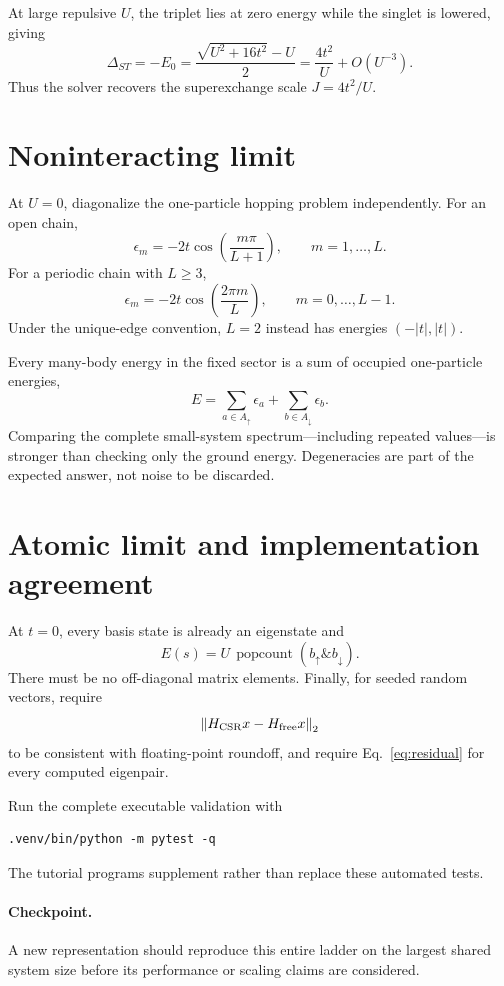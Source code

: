 At large repulsive $U$, the triplet lies at zero energy while the singlet is
lowered, giving
\begin{equation}
\Delta_{ST}=-E_0
=\frac{\sqrt{U^2+16t^2}-U}{2}
=\frac{4t^2}{U}+O(U^{-3}).
\end{equation}
Thus the solver recovers the superexchange scale $J=4t^2/U$.

\section{Noninteracting limit}

At $U=0$, diagonalize the one-particle hopping problem independently.  For an
open chain,
\begin{equation}
\epsilon_m=-2t\cos\left(\frac{m\pi}{L+1}\right),
\qquad m=1,\ldots,L.
\end{equation}
For a periodic chain with $L\ge3$,
\begin{equation}
\epsilon_m=-2t\cos\left(\frac{2\pi m}{L}\right),
\qquad m=0,\ldots,L-1.
\end{equation}
Under the unique-edge convention, $L=2$ instead has energies $(-|t|,|t|)$.

Every many-body energy in the fixed sector is a sum of occupied one-particle
energies,
\begin{equation}
E=\sum_{a\in A_\uparrow}\epsilon_a
 +\sum_{b\in A_\downarrow}\epsilon_b.
\end{equation}
Comparing the complete small-system spectrum---including repeated values---is
stronger than checking only the ground energy.  Degeneracies are part of the
expected answer, not noise to be discarded.

\section{Atomic limit and implementation agreement}

At $t=0$, every basis state is already an eigenstate and
\begin{equation}
E(s)=U\,\operatorname{popcount}(b_\uparrow\mathbin{\texttt{\&}}b_\downarrow).
\end{equation}
There must be no off-diagonal matrix elements.  Finally, for seeded random
vectors, require
\begin{equation}
\left\lVert H_{\mathrm{CSR}}x-H_{\mathrm{free}}x \right\rVert_2
\end{equation}
to be consistent with floating-point roundoff, and require Eq.~\eqref{eq:residual}
for every computed eigenpair.

Run the complete executable validation with
\begin{verbatim}
.venv/bin/python -m pytest -q
\end{verbatim}
The tutorial programs supplement rather than replace these automated tests.

\paragraph{Checkpoint.}
A new representation should reproduce this entire ladder on the largest
shared system size before its performance or scaling claims are considered.
